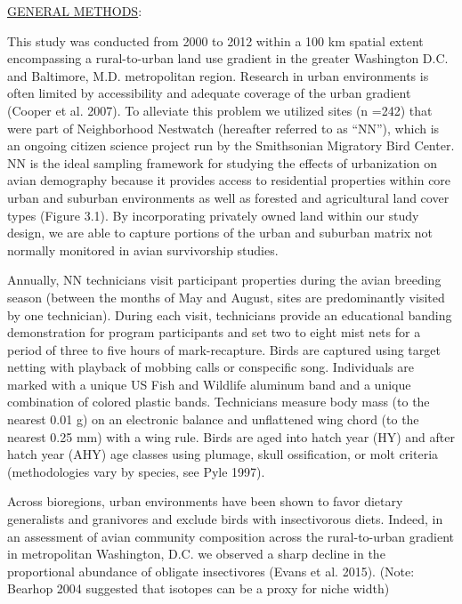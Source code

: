 \documentclass[12pt]{article}
\begin{document}

\noindent \underline{GENERAL METHODS}: 

This study was conducted from 2000 to 2012 within a 100 km spatial extent encompassing a rural-to-urban land use gradient in the greater Washington D.C. and Baltimore, M.D. metropolitan region. Research in urban environments is often limited by accessibility and adequate coverage of the urban gradient (Cooper et al. 2007). To alleviate this problem we utilized sites (n =242) that were part of Neighborhood Nestwatch (hereafter referred to as “NN”), which is an ongoing citizen science project run by the Smithsonian Migratory Bird Center. NN is the ideal sampling framework for studying the effects of urbanization on avian demography because it provides access to residential properties within core urban and suburban environments as well as forested and agricultural land cover types (Figure 3.1). By incorporating privately owned land within our study design, we are able to capture portions of the urban and suburban matrix not normally monitored in avian survivorship studies. \par

Annually, NN technicians visit participant properties during the avian breeding season (between the months of May and August, sites are predominantly visited by one technician). During each visit, technicians provide an educational banding demonstration for program participants and set two to eight mist nets for a period of three to five hours of mark-recapture. Birds are captured using target netting with playback of mobbing calls or conspecific song. Individuals are marked with a unique US Fish and Wildlife aluminum band and a unique combination of colored plastic bands. Technicians measure body mass (to the nearest 0.01 g) on an electronic balance and unflattened wing chord (to the nearest 0.25 mm) with a wing rule. Birds are aged into hatch year (HY) and after hatch year (AHY) age classes using plumage, skull ossification, or molt criteria (methodologies vary by species, see Pyle 1997). \par


 \par
Across bioregions, urban environments have been shown to favor dietary generalists and granivores and exclude birds with insectivorous diets. Indeed, in an assessment of avian community composition across the rural-to-urban gradient in metropolitan Washington, D.C. we observed a sharp decline in the proportional abundance of obligate insectivores (Evans et al. 2015). (Note: Bearhop 2004 suggested that isotopes can be a proxy for niche width)\par
\end{document}
